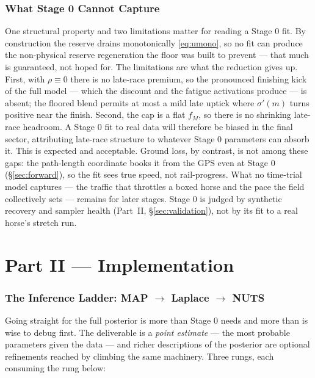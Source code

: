 \documentclass[11pt]{article}
\begin{document}
\section{What Stage 0 Cannot Capture}

One structural property and two limitations matter for reading a Stage 0 fit. By construction the reserve drains monotonically \eqref{eq:umono}, so no fit can produce the non-physical reserve regeneration the floor was built to prevent --- that much is guaranteed, not hoped for. The limitations are what the reduction gives up. First, with $\rho \equiv 0$ there is no late-race premium, so the pronounced finishing kick of the full model --- which the discount and the fatigue activations produce --- is absent; the floored blend permits at most a mild late uptick where $\sigma'(m)$ turns positive near the finish. Second, the cap is a flat $f_M$, so there is no shrinking late-race headroom. A Stage 0 fit to real data will therefore be biased in the final sector, attributing late-race structure to whatever Stage 0 parameters can absorb it. This is expected and acceptable. Ground loss, by contrast, is not among these gaps: the path-length coordinate books it from the GPS even at Stage 0 (\S\ref{sec:forward}), so the fit sees true speed, not rail-progress. What no time-trial model captures --- the traffic that throttles a boxed horse and the pace the field collectively sets --- remains for later stages. Stage 0 is judged by synthetic recovery and sampler health (Part~II, \S\ref{sec:validation}), not by its fit to a real horse's stretch run.

\newpage
\part*{Part II --- Implementation}

\section{The Inference Ladder: MAP \texorpdfstring{$\to$}{->} Laplace \texorpdfstring{$\to$}{->} NUTS}\label{sec:ladder}

Going straight for the full posterior is more than Stage 0 needs and more than is wise to debug first. The deliverable is a \emph{point estimate} --- the most probable parameters given the data --- and richer descriptions of the posterior are optional refinements reached by climbing the same machinery. Three rungs, each consuming the rung below:
\end{document}

